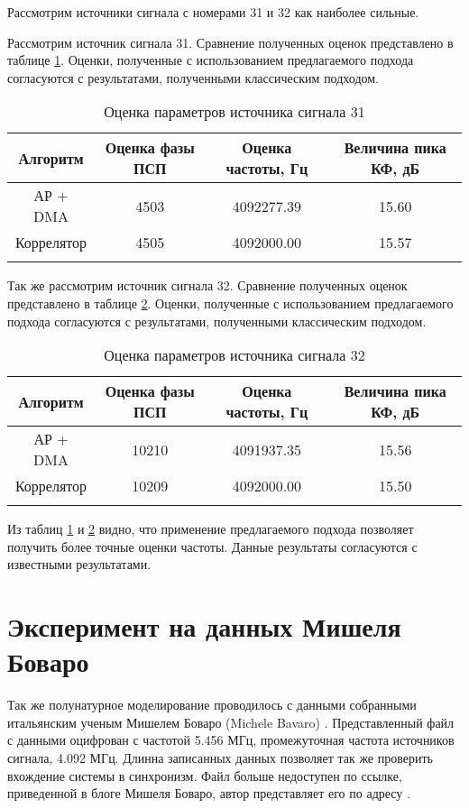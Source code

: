 Рассмотрим источники сигнала с номерами 31 и 32 как наиболее сильные.

Рассмотрим источник сигнала 31. Сравнение полученных оценок представлено в таблице \ref{tbl:16mhz_sat_31}. Оценки, полученные с использованием
предлагаемого подхода согласуются с результатами, полученными классическим подходом.
\begin{center}
	\begin{longtable}{ | c | c | c | c |}
	\hline
	Алгоритм	& Оценка фазы ПСП & Оценка частоты, Гц & Величина пика КФ, дБ \\ \hline
	АР + DMA	& 4503 & 4092277.39	& 15.60 \\ \hline
	Коррелятор & 4505 & 4092000.00	& 15.57 \\ \hline
	\caption{Оценка параметров источника сигнала 31}
	\label{tbl:16mhz_sat_31}
	\end{longtable}
\end{center}

Так же рассмотрим источник сигнала 32.  Сравнение полученных оценок представлено в таблице \ref{tbl:16mhz_sat_32}. Оценки, полученные с использованием
предлагаемого подхода согласуются с результатами, полученными классическим подходом.
\begin{center}
	\begin{longtable}{ | c | c | c | c |}
	\hline
	Алгоритм	& Оценка фазы ПСП & Оценка частоты, Гц & Величина пика КФ, дБ \\ \hline
	АР + DMA	& 10210 & 4091937.35	& 15.56 \\ \hline
	Коррелятор	& 10209 & 4092000.00   	& 15.50 \\ \hline
	\caption{Оценка параметров источника сигнала 32}
	\label{tbl:16mhz_sat_32}
	\end{longtable}
\end{center}

Из таблиц \ref{tbl:16mhz_sat_31} и \ref{tbl:16mhz_sat_32} видно, что применение предлагаемого подхода позволяет получить более точные оценки частоты. Данные
результаты согласуются с известными результатами.

\clearpage
\section{Эксперимент на данных Мишеля Боваро}

Так же полунатурное моделирование проводилось с данными собранными итальянским ученым Мишелем Боваро (Michele Bavaro) \cite{bovaro_blog}. Представленный файл с данными оцифрован
с частотой 5.456 МГц, промежуточная частота источников сигнала, 4.092 МГц. Длинна записанных данных позволяет так же проверить
вхождение системы в синхронизм. Файл больше недоступен по ссылке, приведенной в блоге Мишеля Боваро, автор представляет его по адресу \cite{rflab_primo}.

